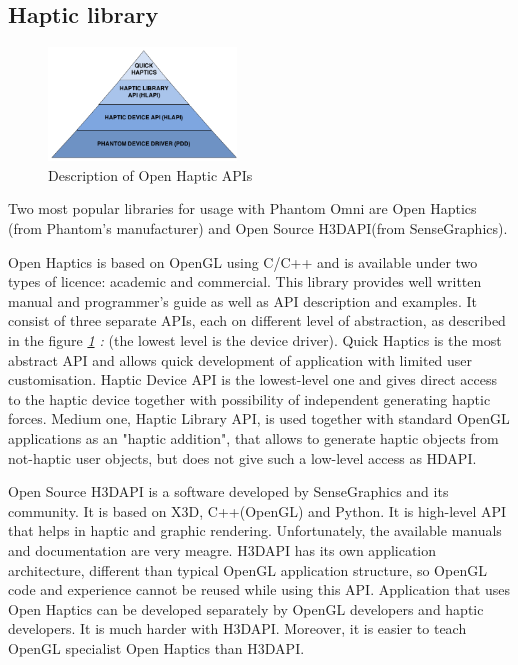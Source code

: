 \subsection{Haptic library}
\begin{figure}
\begin{center}
	\includegraphics[width=5cm]{Images/open_haptics}
	\caption{Description of Open Haptic APIs}
	\label{fig:haptics_api}	
\end{center}
\end{figure}
Two most popular libraries for usage with Phantom Omni are Open Haptics (from Phantom's manufacturer) and Open Source H3DAPI(from SenseGraphics). 

Open Haptics is based on OpenGL using C/C++ and is available under two types of licence: academic and commercial. This library provides well written manual and programmer's guide as well as API description and examples. It consist of three separate APIs, each on different level of abstraction, as described in the figure\emph{ \ref{fig:haptics_api} : }(the lowest level is the device driver). Quick Haptics is the most abstract API and allows quick development of application with limited user customisation. Haptic Device API is the lowest-level one and gives direct access to the haptic device together with possibility of independent generating haptic forces. Medium one, Haptic Library API, is used together with standard OpenGL applications as an "haptic addition", that allows to generate haptic objects from not-haptic user objects, but does not give such a low-level access as HDAPI.

Open Source H3DAPI is a software developed by SenseGraphics and its community. It is based on X3D, C++(OpenGL) and Python. It is high-level API that helps in haptic and graphic rendering. Unfortunately, the available manuals and documentation are very meagre. H3DAPI has its own application architecture, different than typical OpenGL application structure, so OpenGL code and experience cannot be reused while using this API. Application that uses Open Haptics can be developed separately by OpenGL developers and haptic developers. It is much harder with H3DAPI. Moreover, it is easier to teach OpenGL specialist Open Haptics than H3DAPI.

